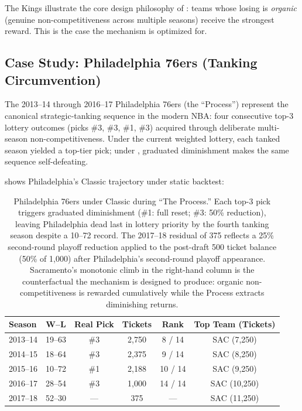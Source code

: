 The Kings illustrate the core design philosophy of \cola{}: teams whose losing is \emph{organic} (genuine non-competitiveness across multiple seasons) receive the strongest reward. This is the case the mechanism is optimized for.

\subsection{Case Study: Philadelphia 76ers (Tanking Circumvention)}
\label{sec:case-phi}

The 2013--14 through 2016--17 Philadelphia 76ers (the ``Process'') represent the canonical strategic-tanking sequence in the modern NBA: four consecutive top-3 lottery outcomes (picks \#3, \#3, \#1, \#3) acquired through deliberate multi-season non-competitiveness. Under the current weighted lottery, each tanked season yielded a top-tier pick; under \cola{}, graduated diminishment makes the same sequence self-defeating.

 shows Philadelphia's Classic \cola{} trajectory under static backtest:

\begin{table}[t]
\centering
\small
\begin{tabular}{lccccc}
\toprule
Season & W--L & Real Pick & \cola{} Tickets & \cola{} Rank & Top Team (Tickets) \\
\midrule
2013--14 & 19--63 & \#3 & 2{,}750 & 8 / 14 & SAC (7{,}250) \\
2014--15 & 18--64 & \#3 & 2{,}375 & 9 / 14 & SAC (8{,}250) \\
2015--16 & 10--72 & \#1 & 2{,}188 & 10 / 14 & SAC (9{,}250) \\
2016--17 & 28--54 & \#3 & 1{,}000 & 14 / 14 & SAC (10{,}250) \\
2017--18 & 52--30 & --- & 375 & --- & SAC (11{,}250) \\
\bottomrule
\end{tabular}
\caption{Philadelphia 76ers under Classic \cola{} during ``The Process.'' Each top-3 pick triggers graduated diminishment (\#1: full reset; \#3: 50\% reduction), leaving Philadelphia dead last in lottery priority by the fourth tanking season despite a 10--72 record. The 2017--18 residual of 375 reflects a 25\% second-round playoff reduction applied to the post-draft 500 ticket balance (50\% of 1{,}000) after Philadelphia's second-round playoff appearance. Sacramento's monotonic climb in the right-hand column is the counterfactual the mechanism is designed to produce: organic non-competitiveness is rewarded cumulatively while the Process extracts diminishing returns.}
\label{tab:phi-process}
\end{table}

